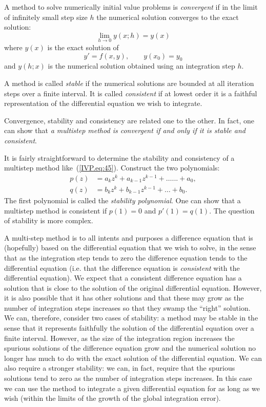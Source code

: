 A method to solve numerically initial value problems is
\textit{convergent} if in the limit of infinitely small step size $h$
the numerical solution converges to the exact solution:
%
\begin{equation}
  \lim_{h \to 0} y(x;h) = y(x)
\end{equation}
%
where $y(x)$ is the exact solution of
%
\begin{equation}
  y' = f(x,y), \qquad y(x_0) = y_0 
\end{equation}
%
and $y(h;x)$ is the numerical solution obtained using an integration
step $h$.

A method is called \textit{stable} if the numerical solutions are
bounded at all iteration steps over a finite interval.  It is called
\textit{consistent} if at lowest order it is a faithful representation
of the differential equation we wish to integrate.

Convergence, stability and consistency are related one to the other.
In fact, one can show that \textit{a multistep method is convergent if
  and only if it is stable and consistent}.

It is fairly straightforward to determine the stability and
consistency of a multistep method like~(\ref{IVP.eq:45}).  Construct
the two polynomials:
% 
\begin{align}
  p(z) &= a_k z^k + a_{k-1} z^{k-1} + \ldots ... + a_0,
  \label{IVP.eq:47} \\
  q(z) &= b_k z^k + b_{k-1} z^{k-1} + \ldots + b_0. \label{IVP.eq:48}
\end{align}
%
The first polynomial is called the \textit{stability polynomial}.  One
can show that a multistep method is consistent if $p(1)=0$ and
$p'(1)=q(1)$.  The question of stability is more complex.

A multi-step method is to all intents and purposes a difference
equation that is (hopefully) based on the differential equation that
we wish to solve, in the sense that as the integration step tends to
zero the difference equation tends to the differential equation
(i.e. that the difference equation is \textit{consistent} with the
differential equation).  We expect that a consistent difference
equation has a solution that is close to the solution of the original
differential equation.  However, it is also possible that it has other
solutions and that these may grow as the number of integration steps
increases so that they swamp the ``right'' solution.  We can,
therefore, consider two cases of stability: a method may be stable in
the sense that it represents faithfully the solution of the
differential equation over a finite interval.  However, as the size of
the integration region increases the spurious solutions of the
difference equation grow and the numerical solution no longer has much
to do with the exact solution of the differential equation.  We can
also require a stronger stability: we can, in fact, require that the
spurious solutions tend to zero as the number of integration steps
increases.  In this case we can use the method to integrate a given
differential equation for as long as we wish (within the limits of the
growth of the global integration error).

